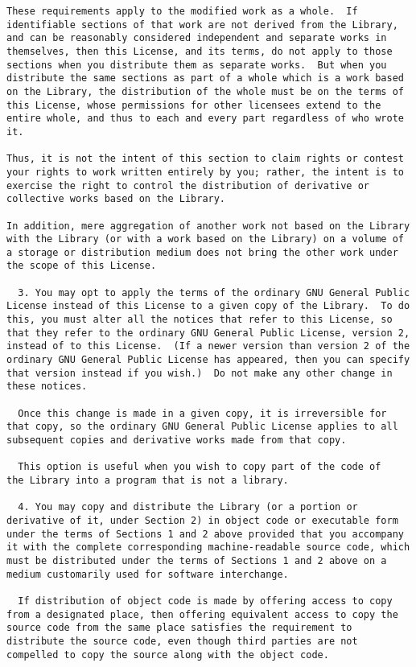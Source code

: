 \documentclass{InsightBook}
\begin{document}
\begin{verbatim}
These requirements apply to the modified work as a whole.  If
identifiable sections of that work are not derived from the Library,
and can be reasonably considered independent and separate works in
themselves, then this License, and its terms, do not apply to those
sections when you distribute them as separate works.  But when you
distribute the same sections as part of a whole which is a work based
on the Library, the distribution of the whole must be on the terms of
this License, whose permissions for other licensees extend to the
entire whole, and thus to each and every part regardless of who wrote
it.

Thus, it is not the intent of this section to claim rights or contest
your rights to work written entirely by you; rather, the intent is to
exercise the right to control the distribution of derivative or
collective works based on the Library.

In addition, mere aggregation of another work not based on the Library
with the Library (or with a work based on the Library) on a volume of
a storage or distribution medium does not bring the other work under
the scope of this License.

  3. You may opt to apply the terms of the ordinary GNU General Public
License instead of this License to a given copy of the Library.  To do
this, you must alter all the notices that refer to this License, so
that they refer to the ordinary GNU General Public License, version 2,
instead of to this License.  (If a newer version than version 2 of the
ordinary GNU General Public License has appeared, then you can specify
that version instead if you wish.)  Do not make any other change in
these notices.

  Once this change is made in a given copy, it is irreversible for
that copy, so the ordinary GNU General Public License applies to all
subsequent copies and derivative works made from that copy.

  This option is useful when you wish to copy part of the code of
the Library into a program that is not a library.

  4. You may copy and distribute the Library (or a portion or
derivative of it, under Section 2) in object code or executable form
under the terms of Sections 1 and 2 above provided that you accompany
it with the complete corresponding machine-readable source code, which
must be distributed under the terms of Sections 1 and 2 above on a
medium customarily used for software interchange.

  If distribution of object code is made by offering access to copy
from a designated place, then offering equivalent access to copy the
source code from the same place satisfies the requirement to
distribute the source code, even though third parties are not
compelled to copy the source along with the object code.


\end{verbatim}
\end{document}
